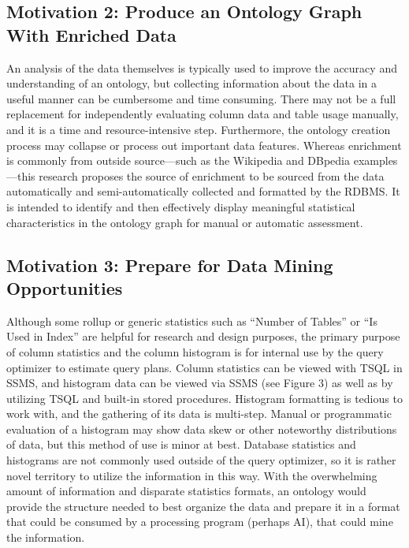 \documentclass[sigconf]{acmart}
\begin{document}
\subsection{Motivation 2: Produce an Ontology Graph With Enriched Data}
An analysis of the data themselves is typically used to improve the accuracy and
understanding of an ontology, but collecting information about the data in a useful manner can be cumbersome and time consuming. There may not be a full replacement for independently evaluating column data and table usage manually, and it is a time and resource-intensive step. Furthermore, the ontology creation process may collapse or process out important data features. Whereas enrichment is commonly from outside source—such as the Wikipedia \cite{tramontana2022ontology} and DBpedia \cite{booshehri2015ontology} examples—this research proposes the source of enrichment to be sourced from the data automatically and semi-automatically collected and formatted by the RDBMS. It is intended to identify and then effectively display meaningful statistical characteristics in the ontology graph for manual or automatic assessment. 

\subsection{Motivation 3: Prepare for Data Mining Opportunities}
Although some rollup or generic statistics such as “Number of Tables” or “Is Used in
Index” are helpful for research and design purposes, the primary purpose of column statistics and the column histogram is for internal use by the query optimizer to estimate query plans. Column statistics can be viewed with TSQL in SSMS, and histogram data can be viewed via SSMS (see Figure 3) as well as by utilizing TSQL and built-in stored procedures. Histogram formatting is tedious to work with, and the gathering of its data is multi-step. Manual or programmatic evaluation of a histogram may show data skew or other noteworthy distributions of data, but this method of use is minor at best. Database statistics and histograms are not commonly used outside
of the query optimizer, so it is rather novel territory to utilize the information in this way. With the overwhelming amount of information and disparate statistics formats, an ontology would provide the structure needed to best organize the data and prepare it in a format that could be consumed by a processing program (perhaps AI), that could mine the information. 
\end{document}

